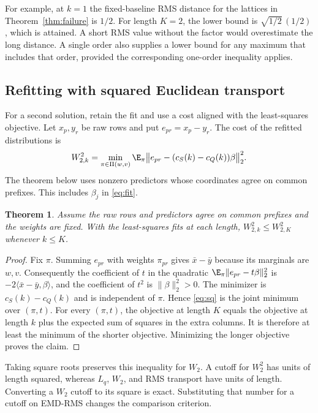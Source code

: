 \documentclass[11pt,a4paper]{article}
\newtheorem{theorem}{Theorem}
\theoremstyle{definition}
\begin{document}
For example, at \(k=1\) the fixed-baseline RMS distance for the lattices in Theorem~\ref{thm:failure} is \(1/2\). For length \(K=2\), the lower bound is \(\sqrt{1/2}\,(1/2)\), which is attained. A short RMS value without the factor would overestimate the long distance. A single order also supplies a lower bound for any maximum that includes that order, provided the corresponding one-order inequality applies.

\subsection{Refitting with squared Euclidean transport}

For a second solution, retain the fit and use a cost aligned with the least-squares objective. Let \(x_p,y_r\) be raw rows and put \(e_{pr}=x_p-y_r\). The cost of the refitted distributions is
\begin{equation}\label{eq:sq}
W_{2,k}^2=\min_{\pi\in\Pi(w,v)}\E_\pi
\bigl\|e_{pr}-(c_S(k)-c_Q(k))\beta\bigr\|_2^2 .
\end{equation}
The theorem below uses nonzero predictors whose coordinates agree on common prefixes. This includes \(\beta_j\) in \eqref{eq:fit}.

\begin{theorem}\label{thm:sq}
Assume the raw rows and predictors agree on common prefixes and the weights are fixed. With the least-squares fits at each length, \(W_{2,k}^2\le W_{2,K}^2\) whenever \(k\le K\).
\end{theorem}

\begin{proof}
Fix \(\pi\). Summing \(e_{pr}\) with weights \(\pi_{pr}\) gives \(\bar x-\bar y\) because its marginals are \(w,v\). Consequently the coefficient of \(t\) in the quadratic \(\E_\pi\|e_{pr}-t\beta\|_2^2\) is \(-2\langle\bar x-\bar y,\beta\rangle\), and the coefficient of \(t^2\) is \(\|\beta\|_2^2>0\). The minimizer is \(c_S(k)-c_Q(k)\) and is independent of \(\pi\). Hence \eqref{eq:sq} is the joint minimum over \((\pi,t)\). For every \((\pi,t)\), the objective at length \(K\) equals the objective at length \(k\) plus the expected sum of squares in the extra columns. It is therefore at least the minimum of the shorter objective. Minimizing the longer objective proves the claim.
\end{proof}

Taking square roots preserves this inequality for \(W_2\). A cutoff for \(W_2^2\) has units of length squared, whereas \(L_q\), \(W_2\), and RMS transport have units of length. Converting a \(W_2\) cutoff to its square is exact. Substituting that number for a cutoff on EMD-RMS changes the comparison criterion.
\end{document}
